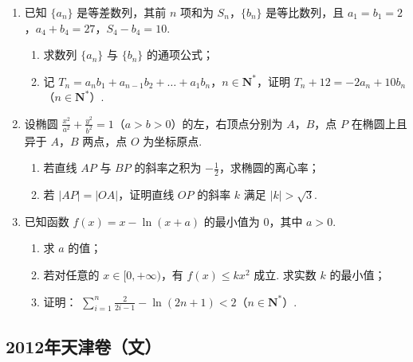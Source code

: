 \begin{description}
\begin{enumerate}[leftmargin=5pt]
        \item 已知 \(\{a_{n}\}\) 是等差数列，其前 \(n\) 项和为 \(S_{n}\)，\(\{b_{n}\}\) 是等比数列，且 \(a_{1} = b_{1} = 2\)，\(a_{4} + b_{4} = 27\)，\(S_{4} - b_{4} = 10\).

\begin{enumerate}
\item 求数列 \( \{a_{n}\} \) 与 \( \{b_{n}\} \) 的通项公式；
\item 记 \(T_{n} = a_{n}b_{1} + a_{n - 1}b_{2} + \dots +a_{1}b_{n}\)，\(n \in \mathbf{N}^{*}\)，证明 \(T_{n} + 12 = -2a_{n} + 10b_{n}\) （\(n \in \mathbf{N}^{*}\)）.
\end{enumerate}

        \item 设椭圆 \(\frac{x^2}{a^2} + \frac{y^2}{b^2} = 1\)（\(a > b > 0\)）的左，右顶点分别为 \(A\)，\(B\)，点 \(P\) 在椭圆上且异于 \(A\)，\(B\) 两点，点 \(O\) 为坐标原点.

\begin{enumerate}
\item 若直线 \(AP\) 与 \(BP\) 的斜率之积为 \(-\frac{1}{2}\)，求椭圆的离心率；
\item 若 \( \left|AP\right|=\left|OA\right| \)，证明直线 \(OP\) 的斜率 \(k\) 满足 \( \left|k\right|>\sqrt{3} \).
\end{enumerate}

        \item 已知函数 \( f(x) = x - \ln (x + a) \) 的最小值为 0，其中 \( a > 0 \).

\begin{enumerate}
\item 求 \(a\) 的值；
\item 若对任意的 \(x \in [0, +\infty)\)，有 \(f(x) \leqslant kx^2\) 成立. 求实数 \(k\) 的最小值；
\item 证明： \(\sum_{i=1}^{n} \frac{2}{2i-1} - \ln(2n+1) < 2\)（\(n \in \mathbf{N}^*\)）.
\end{enumerate}

    \end{enumerate}

\end{description}


\subsection{2012年天津卷（文）}\label{gk:2012年天津卷（文）}

